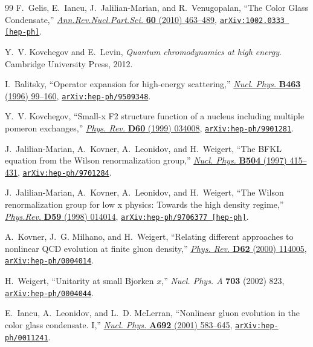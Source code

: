 \begin{thebibliography}{99}
F.~Gelis, E.~Iancu, J.~Jalilian-Marian, and R.~Venugopalan, ``{The Color Glass
  Condensate},''
  \href{http://dx.doi.org/10.1146/annurev.nucl.010909.083629}{{\em
  Ann.Rev.Nucl.Part.Sci.} {\bf 60} (2010)  463--489},
\href{http://arxiv.org/abs/1002.0333}{{\tt arXiv:1002.0333 [hep-ph]}}.

Y.~V. Kovchegov and E.~Levin, {\em {Quantum chromodynamics at high energy}}.
 {Cambridge University Press},
2012.

I.~Balitsky, ``{Operator expansion for high-energy scattering},''
  \href{http://dx.doi.org/10.1016/0550-3213(95)00638-9}{{\em Nucl. Phys.} {\bf
  B463} (1996)  99--160},
\href{http://arxiv.org/abs/hep-ph/9509348}{{\tt arXiv:hep-ph/9509348}}.

Y.~V. Kovchegov, ``{Small-x F2 structure function of a nucleus including
  multiple pomeron exchanges},''
  \href{http://dx.doi.org/10.1103/PhysRevD.60.034008}{{\em Phys. Rev.} {\bf
  D60} (1999)  034008},
\href{http://arxiv.org/abs/hep-ph/9901281}{{\tt arXiv:hep-ph/9901281}}.

J.~Jalilian-Marian, A.~Kovner, A.~Leonidov, and H.~Weigert, ``{The BFKL
  equation from the Wilson renormalization group},''
  \href{http://dx.doi.org/10.1016/S0550-3213(97)00440-9}{{\em Nucl. Phys.} {\bf
  B504} (1997)  415--431},
\href{http://arxiv.org/abs/hep-ph/9701284}{{\tt arXiv:hep-ph/9701284}}.

J.~Jalilian-Marian, A.~Kovner, A.~Leonidov, and H.~Weigert, ``{The Wilson
  renormalization group for low x physics: Towards the high density regime},''
  \href{http://dx.doi.org/10.1103/PhysRevD.59.014014}{{\em Phys.Rev.} {\bf D59}
  (1998)  014014},
\href{http://arxiv.org/abs/hep-ph/9706377}{{\tt arXiv:hep-ph/9706377
  [hep-ph]}}.

A.~Kovner, J.~G. Milhano, and H.~Weigert, ``{Relating different approaches to
  nonlinear QCD evolution at finite gluon density},''
  \href{http://dx.doi.org/10.1103/PhysRevD.62.114005}{{\em Phys. Rev.} {\bf
  D62} (2000)  114005},
\href{http://arxiv.org/abs/hep-ph/0004014}{{\tt arXiv:hep-ph/0004014}}.

H.~Weigert, ``{Unitarity at small Bjorken $x$},'' {\em Nucl. Phys. A} {\bf 703} (2002) 823, \href{http://arxiv.org/abs/hep-ph/0004044}{{\tt arXiv:hep-ph/0004044}}.

E.~Iancu, A.~Leonidov, and L.~D. McLerran, ``{Nonlinear gluon evolution in the
  color glass condensate. I},''
  \href{http://dx.doi.org/10.1016/S0375-9474(01)00642-X}{{\em Nucl. Phys.} {\bf
  A692} (2001)  583--645},
\href{http://arxiv.org/abs/hep-ph/0011241}{{\tt arXiv:hep-ph/0011241}}.


\end{thebibliography}
